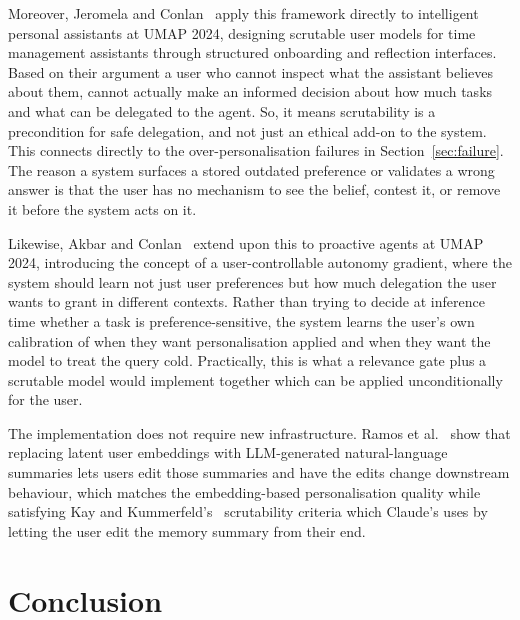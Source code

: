 \documentclass[runningheads]{llncs}
\begin{document}
Moreover, Jeromela and Conlan~\cite{jeromela2024} apply this framework directly to intelligent personal assistants at UMAP 2024, designing scrutable user models for time management assistants through structured onboarding and reflection interfaces. Based on their argument a user who cannot inspect what the assistant believes about them, cannot actually make an informed decision about how much tasks and what can be delegated to the agent. So, it means scrutability is a precondition for safe delegation, and not just an ethical add-on to the system. This connects directly to the over-personalisation failures in Section~\ref{sec:failure}. The reason a system surfaces a stored outdated preference or validates a wrong answer is that the user has no mechanism to see the belief, contest it, or remove it before the system acts on it.

Likewise, Akbar and Conlan~\cite{akbar2024} extend upon this to proactive agents at UMAP 2024, introducing the concept of a user-controllable autonomy gradient, where the system should learn not just user preferences but how much delegation the user wants to grant in different contexts. Rather than trying to decide at inference time whether a task is preference-sensitive, the system learns the user's own calibration of when they want personalisation applied and when they want the model to treat the query cold. Practically, this is what a relevance gate plus a scrutable model would implement together which can be applied unconditionally for the user.

The implementation does not require new infrastructure. Ramos et al.~\cite{ramos2024} show that replacing latent user embeddings with LLM-generated natural-language summaries lets users edit those summaries and have the edits change downstream behaviour, which matches the embedding-based personalisation quality while satisfying Kay and Kummerfeld's~\cite{kay2013} scrutability criteria which Claude's uses by letting the user edit the memory summary from their end.

\section{Conclusion}
\label{sec:conclusion}
\end{document}
